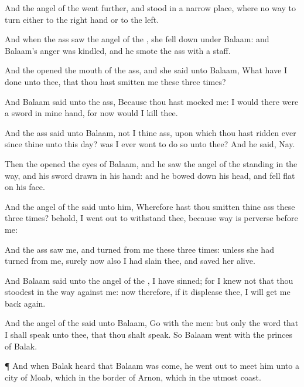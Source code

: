 {And the
angel of the
{}
went
further, and
stood in a
narrow
place, where
{} no
way to
turn either to the right
hand or to the
left.

And when the
ass
saw the
angel of the
{}, she fell
down under
Balaam: and
Balaam’s
anger was
kindled, and he
smote the
ass with a
staff.

And the
{}
opened the
mouth of the
ass, and she
said unto
Balaam, What have I
done unto thee, that thou hast
smitten me these
three
times?

And
Balaam
said unto the
ass, Because thou hast
mocked me: I
would there
were a
sword in mine
hand, for now would I
kill thee.

And the
ass
said unto
Balaam,
{} not I thine
ass, upon which thou hast
ridden ever since
{} thine unto this
day? was I
ever
wont to do
so unto thee? And he
said, Nay.

Then the
{}
opened the
eyes of
Balaam, and he
saw the
angel of the
{}
standing in the
way, and his
sword
drawn in his
hand: and he bowed
down his head, and fell
flat on his
face.

And the
angel of the
{}
said unto him, Wherefore hast thou
smitten thine
ass these
three
times? behold, I went
out to
withstand thee, because
{}
way is
perverse before me:

And the
ass
saw me, and
turned from
me these
three
times:
unless she had
turned from
me, surely now also I had
slain thee, and saved her
alive.

And
Balaam
said unto the
angel of the
{}, I have
sinned; for I
knew not that thou
stoodest in the
way
against me: now therefore, if it displease
thee, I will get me back
again.

And the
angel of the
{}
said unto
Balaam,
Go with the
men: but
only the
word that I shall
speak unto thee, that thou shalt
speak. So
Balaam
went with the
princes of
Balak.


\par }{\PP {}¶ And when
Balak
heard that
Balaam was
come, he went
out to
meet him unto a
city of
Moab, which
{} in the
border of
Arnon, which
{} in the
utmost
coast.

}
